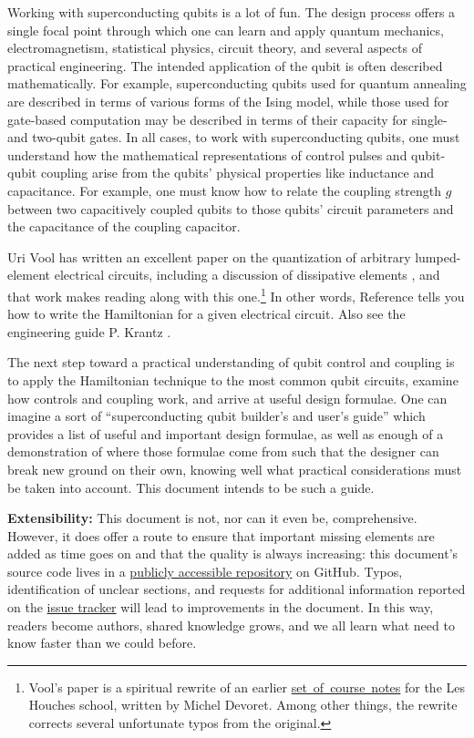 
Working with superconducting qubits is a lot of fun.
The design process offers a single focal point through which one can learn and apply quantum mechanics, electromagnetism, statistical physics, circuit theory, and several aspects of practical engineering.
The intended application of the qubit is often described mathematically.
For example, superconducting qubits used for quantum annealing are described in terms of various forms of the Ising model, while those used for gate-based computation may be described in terms of their capacity for single- and two-qubit gates.
In all cases, to work with superconducting qubits, one must understand how the mathematical representations of control pulses and qubit-qubit coupling arise from the qubits' physical properties like inductance and capacitance.
For example, one must know how to relate the coupling strength $g$ between two capacitively coupled qubits to those qubits' circuit parameters and the capacitance of the coupling capacitor.

Uri Vool has written an excellent paper on the quantization of arbitrary lumped-element electrical circuits, including a discussion of dissipative elements \cite{Vool:quantumCircuits}, and that work makes reading along with this one.\footnote{Vool's paper is a spiritual rewrite of an earlier \mbox{\href{http://qulab.eng.yale.edu/documents/reprints/Houches_fluctuations.pdf}{set of course notes}} for the Les Houches school, written by Michel Devoret. Among other things, the rewrite corrects several unfortunate typos from the original.}
In other words, Reference \cite{Vool:quantumCircuits} tells you how to write the Hamiltonian for a given electrical circuit.
Also see the engineering guide P. Krantz \cite{Krantz:guide2019}.

The next step toward a practical understanding of qubit control and coupling is to apply the Hamiltonian technique to the most common qubit circuits, examine how controls and coupling work, and arrive at useful design formulae.
One can imagine a sort of ``superconducting qubit builder's and user's guide'' which provides a list of useful and important design formulae, as well as enough of a demonstration of where those formulae come from such that the designer can break new ground on their own, knowing well what practical considerations must be taken into account.
This document intends to be such a guide.

\textbf{Extensibility:} This document is not, nor can it even be, comprehensive.
However, it does offer a route to ensure that important missing elements are added as time goes on and that the quality is always increasing: this document's source code lives in a \href{https://github.com/danielsank/theory}{publicly accessible repository} on GitHub.
Typos, identification of unclear sections, and requests for additional information reported on the \href{https://github.com/danielsank/theory/issues}{issue tracker} will lead to improvements in the document.
In this way, readers become authors, shared knowledge grows, and we all learn what need to know faster than we could before.
